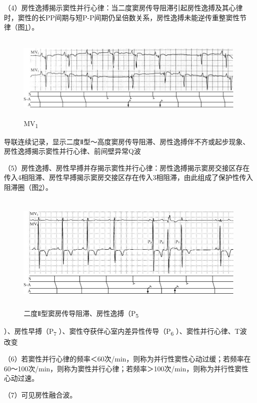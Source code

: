 （4）房性逸搏揭示窦性并行心律：当二度窦房传导阻滞引起房性逸搏及其心律时，窦性的长PP间期与短P-P间期仍呈倍数关系，房性逸搏未能逆传重整窦性节律（图\ref{fig16-4}）。

\begin{figure}[!htbp]
 \centering
 \includegraphics[width=5.78125in,height=1.63542in]{./images/Image00280.jpg}
 \captionsetup{justification=centering}
 \caption{MV\textsubscript{1}}
 \label{fig16-4}
  \end{figure} 
导联连续记录，显示二度Ⅱ型～高度窦房传导阻滞、房性逸搏伴不齐或起步现象、房性逸搏揭示窦性并行心律、前间壁异常Q波

（5）房性逸搏、房性早搏并存揭示窦性并行心律：房性逸搏揭示窦房交接区存在传入4相阻滞、房性早搏揭示窦房交接区存在传入3相阻滞，由此组成了保护性传入阻滞圈（图\ref{fig16-5}）。

\begin{figure}[!htbp]
 \centering
 \includegraphics[width=5.73958in,height=2.26042in]{./images/Image00281.jpg}
 \captionsetup{justification=centering}
 \caption{二度Ⅱ型窦房传导阻滞、房性逸搏（P\textsubscript{5}}
 \label{fig16-5}
  \end{figure} 
）、房性早搏（P\textsubscript{7}
）、窦性夺获伴心室内差异性传导（P\textsubscript{6}
）、窦性并行心律、T波改变

（6）若窦性并行心律的频率＜60次/min，则称为并行性窦性心动过缓；若频率在60～100次/min，则称为窦性并行心律；若频率＞100次/min，则称为并行性窦性心动过速。

（7）可见房性融合波。

\protect\hypertarget{text00023.htmlux5cux23subid285}{}{}

